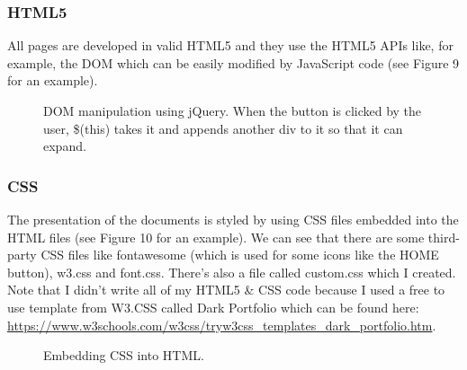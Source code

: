 \documentclass[12pt]{article} %
\begin{document}
  \subsubsection{HTML5  \cite{html5}} All pages are developed in valid HTML5 and they use the HTML5 APIs like, for example, the DOM which can be easily modified by JavaScript code (see Figure 9 for an example).

	\begin{figure}[H] %
	\caption{DOM manipulation using jQuery. When the button is clicked by the user, \$(this) takes it and appends another div to it so that it can expand.}
	\label{htmlAPI}
	\end{figure}

  \subsubsection{CSS \cite{css}} The presentation of the documents is styled by using CSS files embedded into the HTML files (see Figure 10 for an example).
	We can see that there are some third-party CSS files like fontawesome (which is used for some icons like the HOME button), w3.css and font.css. There's also a file called custom.css which I created.
 	Note that I didn't write all of my HTML5 \& CSS code because I used a free to use template from W3.CSS called Dark Portfolio which can be found here: 
	\url{https://www.w3schools.com/w3css/tryw3css_templates_dark_portfolio.htm}.

	\begin{figure}[H] %
	\caption{Embedding CSS into HTML.}
	\label{embeddedCSS}
	\end{figure}
\end{document}
